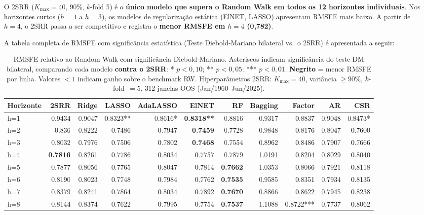\documentclass[12pt, a4paper]{article}
\begin{document}
\begin{destaque}
  O 2SRR ($K_{\max}=40$, 90\%, $k$-fold 5) é o \textbf{único
  modelo que supera o Random Walk em todos os 12 horizontes
  individuais}. Nos horizontes curtos ($h=1$ a $h=3$), os modelos
  de regularização estática (ElNET, LASSO) apresentam RMSFE
  mais baixo. A partir de $h=4$, o 2SRR passa a ser competitivo
  e registra o \textbf{menor RMSFE em $h=4$ (0{,}782)}.
\end{destaque}

A tabela completa de RMSFE com significância estatística
(Teste Diebold-Mariano bilateral vs.\ o 2SRR) é apresentada
a seguir:

\vspace{0.5em}
\begin{table}[H]
\centering
\caption{RMSFE relativo ao Random Walk com significância Diebold-Mariano.
  Asteriscos indicam significância do teste DM bilateral, comparando
  cada modelo \textbf{contra o 2SRR}: * $p<0{,}10$; ** $p<0{,}05$;
  *** $p<0{,}01$.
  \textbf{Negrito} = menor RMSFE por linha.
  Valores $< 1$ indicam ganho sobre o benchmark RW.
  Hiperparâmetros 2SRR: $K_{\max}=40$, variância $\geq 90\%$, $k$-fold~$=5$.
  312 janelas OOS (Jan/1960--Jun/2025).}
\label{tab:rmsfe_dm}
{\footnotesize
\begin{tabular}{lrrrrrrrrrr}
\hline
Horizonte & 2SRR & Ridge & LASSO & AdaLASSO & ElNET & RF & Bagging & Factor & AR & CSR \\
\hline
h=1  & 0.9434 & 0.9047 & 0.8323** & 0.8616* & \textbf{0.8318**} & 0.8816 & 0.9317 & 0.8837 & 0.9048 & 0.8473* \\
h=2  & 0.836  & 0.8222 & 0.7486   & 0.7947   & \textbf{0.7459}   & 0.7728 & 0.9848 & 0.8176 & 0.8047 & 0.7600  \\
h=3  & 0.8032 & 0.7976 & 0.7506   & 0.7802   & \textbf{0.7468}   & 0.7554 & 0.8962 & 0.8486 & 0.7907 & 0.7666  \\
h=4  & \textbf{0.7816} & 0.8261 & 0.7786 & 0.8034 & 0.7757 & 0.7879 & 1.0191 & 0.8204 & 0.8029 & 0.8040 \\
h=5  & 0.7877 & 0.8056 & 0.7765   & 0.8047   & 0.7814   & \textbf{0.7662} & 1.0353 & 0.8066 & 0.7921 & 0.8118 \\
h=6  & 0.8190 & 0.8023 & 0.7748   & 0.7984   & 0.7762   & \textbf{0.7535} & 0.9585 & 0.8351 & 0.7934 & 0.8135 \\
h=7  & 0.8379 & 0.8241 & 0.7864   & 0.8034   & 0.7892   & \textbf{0.7670} & 0.8866 & 0.8622 & 0.7945 & 0.8238 \\
h=8  & 0.8144 & 0.8374 & 0.7622   & 0.7995   & 0.7754   & \textbf{0.7537} & 1.1088 & 0.8722*** & 0.7737 & 0.8062 \\

\end{tabular}}
\end{table}
\end{document}
